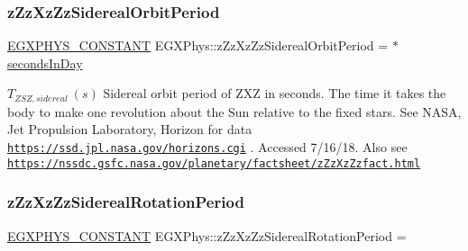 \subsubsection{\texorpdfstring{z\+Zz\+Xz\+Zz\+Sidereal\+Orbit\+Period}{zZzXzZzSiderealOrbitPeriod}}
{\footnotesize\ttfamily \mbox{\hyperlink{group___e_g_x_phys-_constants-_macros_ga76980d288494ce1714c9ac68a95ba702}{E\+G\+X\+P\+H\+Y\+S\+\_\+\+C\+O\+N\+S\+T\+A\+NT}} E\+G\+X\+Phys\+::z\+Zz\+Xz\+Zz\+Sidereal\+Orbit\+Period = $\ast$\mbox{\hyperlink{namespace_e_g_x_phys_a93d2a00d75411b58cbf63ab3fd1f8bc2}{seconds\+In\+Day}}}

$ T_{ZSZ,sidereal} \ (s)$ Sidereal orbit period of Z\+XZ in seconds. The time it takes the body to make one revolution about the Sun relative to the fixed stars. See N\+A\+SA, Jet Propulsion Laboratory, Horizon for data \href{https://ssd.jpl.nasa.gov/horizons.cgi}{\tt https\+://ssd.\+jpl.\+nasa.\+gov/horizons.\+cgi} . Accessed 7/16/18. Also see \href{https://nssdc.gsfc.nasa.gov/planetary/factsheet/zZzXzZzfact.html}{\tt https\+://nssdc.\+gsfc.\+nasa.\+gov/planetary/factsheet/z\+Zz\+Xz\+Zzfact.\+html} \mbox{\label{group___e_g_x_phys-_constants-_astrophysics-_solar_system-_z_x_z-_orbit_ga2fd2f79a77bf3a12aa8eb09af8031d4c}} 
\subsubsection{\texorpdfstring{z\+Zz\+Xz\+Zz\+Sidereal\+Rotation\+Period}{zZzXzZzSiderealRotationPeriod}}
{\footnotesize\ttfamily \mbox{\hyperlink{group___e_g_x_phys-_constants-_macros_ga76980d288494ce1714c9ac68a95ba702}{E\+G\+X\+P\+H\+Y\+S\+\_\+\+C\+O\+N\+S\+T\+A\+NT}} E\+G\+X\+Phys\+::z\+Zz\+Xz\+Zz\+Sidereal\+Rotation\+Period =}

